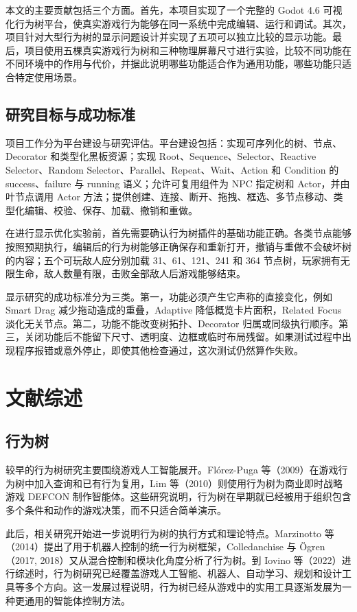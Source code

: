 \documentclass[11pt,a4paper,oneside,extrafontsizes]{memoir}
\begin{document}
本文的主要贡献包括三个方面。首先，本项目实现了一个完整的 Godot 4.6 可视化行为树平台，使真实游戏行为能够在同一系统中完成编辑、运行和调试。其次，项目针对大型行为树的显示问题设计并实现了五项可以独立比较的显示功能。最后，项目使用五棵真实游戏行为树和三种物理屏幕尺寸进行实验，比较不同功能在不同环境中的作用与代价，并据此说明哪些功能适合作为通用功能，哪些功能只适合特定使用场景。

\section{研究目标与成功标准}

项目工作分为平台建设与研究评估。平台建设包括：实现可序列化的树、节点、Decorator 和类型化黑板资源；实现 Root、Sequence、Selector、Reactive Selector、Random Selector、Parallel、Repeat、Wait、Action 和 Condition 的 success、failure 与 running 语义；允许可复用组件为 NPC 指定树和 Actor，并由叶节点调用 Actor 方法；提供创建、连接、断开、拖拽、框选、多节点移动、类型化编辑、校验、保存、加载、撤销和重做。

在进行显示优化实验前，首先需要确认行为树插件的基础功能正确。各类节点能够按照预期执行，编辑后的行为树能够正确保存和重新打开，撤销与重做不会破坏树的内容；五个可玩敌人应分别加载 31、61、121、241 和 364 节点树，玩家拥有无限生命，敌人数量有限，击败全部敌人后游戏能够结束。

显示研究的成功标准分为三类。第一，功能必须产生它声称的直接变化，例如 Smart Drag 减少拖动造成的重叠，Adaptive 降低概览卡片面积，Related Focus 淡化无关节点。第二，功能不能改变树拓扑、Decorator 归属或同级执行顺序。第三，关闭功能后不能留下尺寸、透明度、边框或临时布局残留。如果测试过程中出现程序报错或意外停止，即使其他检查通过，这次测试仍然算作失败。

\chapter{文献综述}

\section{行为树}

较早的行为树研究主要围绕游戏人工智能展开。Flórez-Puga 等（2009）在游戏行为树中加入查询和已有行为复用，Lim 等（2010）则使用行为树为商业即时战略游戏 DEFCON 制作智能体。这些研究说明，行为树在早期就已经被用于组织包含多个条件和动作的游戏决策，而不只适合简单演示。

此后，相关研究开始进一步说明行为树的执行方式和理论特点。Marzinotto 等（2014）提出了用于机器人控制的统一行为树框架，Colledanchise 与 Ögren（2017, 2018）又从混合控制和模块化角度分析了行为树。到 Iovino 等（2022）进行综述时，行为树研究已经覆盖游戏人工智能、机器人、自动学习、规划和设计工具等多个方向。这一发展过程说明，行为树已经从游戏中的实用工具逐渐发展为一种更通用的智能体控制方法。
\end{document}

